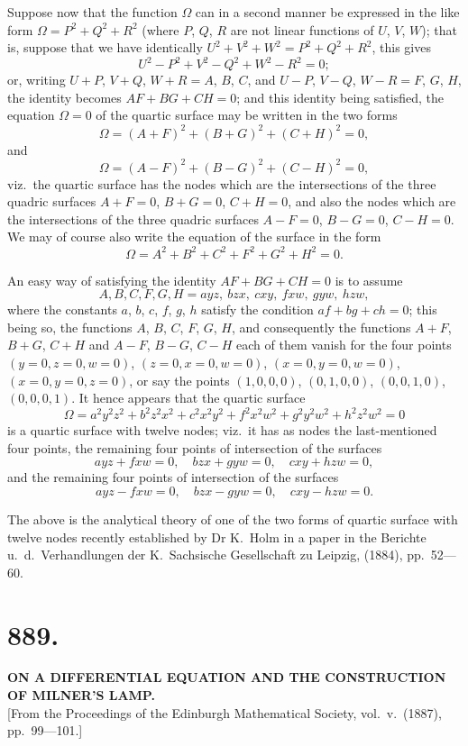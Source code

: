 \documentclass[11pt,a4paper]{book}
\begin{document}
Suppose now that the function $\Omega$ can in a second manner be expressed in the like form $\Omega = P^2 + Q^2 + R^2$ (where $P$, $Q$, $R$ are not linear functions of $U$, $V$, $W$); that is, suppose that we have identically $U^2 + V^2 + W^2 = P^2 + Q^2 + R^2$, this gives
\[
U^2 - P^2 + V^2 - Q^2 + W^2 - R^2 = 0;
\]
or, writing $U+P$, $V+Q$, $W+R = A$, $B$, $C$, and $U-P$, $V-Q$, $W-R = F$, $G$, $H$, the identity becomes $AF + BG + CH = 0$; and this identity being satisfied, the equation $\Omega = 0$ of the quartic surface may be written in the two forms
\[
\Omega = (A+F)^2 + (B+G)^2 + (C+H)^2 = 0,
\]
and
\[
\Omega = (A-F)^2 + (B-G)^2 + (C-H)^2 = 0,
\]
viz.\ the quartic surface has the nodes which are the intersections of the three quadric surfaces $A+F=0$, $B+G=0$, $C+H=0$, and also the nodes which are the intersections of the three quadric surfaces $A-F=0$, $B-G=0$, $C-H=0$. We may of course also write the equation of the surface in the form
\[
\Omega = A^2 + B^2 + C^2 + F^2 + G^2 + H^2 = 0.
\]

An easy way of satisfying the identity $AF+BG+CH=0$ is to assume
\[
A, B, C, F, G, H = ayz,\ bzx,\ cxy,\ fxw,\ gyw,\ hzw,
\]
where the constants $a$, $b$, $c$, $f$, $g$, $h$ satisfy the condition $af + bg + ch = 0$; this being so, the functions $A$, $B$, $C$, $F$, $G$, $H$, and consequently the functions $A+F$, $B+G$, $C+H$ and $A-F$, $B-G$, $C-H$ each of them vanish for the four points $(y=0, z=0, w=0)$, $(z=0, x=0, w=0)$, $(x=0, y=0, w=0)$, $(x=0, y=0, z=0)$, or say the points $(1,0,0,0)$, $(0,1,0,0)$, $(0,0,1,0)$, $(0,0,0,1)$. It hence appears that the quartic surface
\[
\Omega = a^2y^2z^2 + b^2z^2x^2 + c^2x^2y^2 + f^2x^2w^2 + g^2y^2w^2 + h^2z^2w^2 = 0
\]
is a quartic surface with twelve nodes; viz.\ it has as nodes the last-mentioned four points, the remaining four points of intersection of the surfaces
\[
ayz + fxw = 0,\quad bzx + gyw = 0,\quad cxy + hzw = 0,
\]
and the remaining four points of intersection of the surfaces
\[
ayz - fxw = 0,\quad bzx - gyw = 0,\quad cxy - hzw = 0.
\]

The above is the analytical theory of one of the two forms of quartic surface with twelve nodes recently established by Dr K.\ Holm in a paper in the Berichte u.\ d.\ Verhandlungen der K.\ Sachsische Gesellschaft zu Leipzig, (1884), pp.\ 52---60.


\section*{889.}
\begin{center}
{\large\bfseries ON A DIFFERENTIAL EQUATION AND THE CONSTRUCTION OF MILNER'S LAMP.}\\[0.5em]
\small [From the Proceedings of the Edinburgh Mathematical Society, vol.\ v.\ (1887), pp.\ 99---101.]
\end{center}
\end{document}
